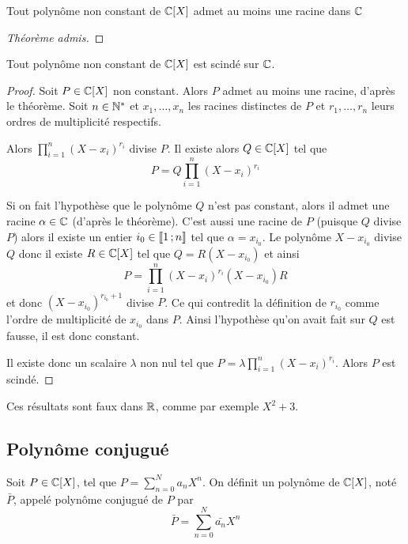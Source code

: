 \begin{theo}
  Tout polynôme non constant de \(\mathbb{C}[X]\) admet au moins une racine dans \(\mathbb{C}\)
\end{theo}
\begin{proof}[Théorème admis]
\end{proof}

\begin{cor}
  Tout polynôme non constant de \(\mathbb{C}[X]\) est scindé sur \(\mathbb{C}\).
\end{cor}
\begin{proof}
  Soit \(P \in \mathbb{C}[X]\) non constant. Alors \(P\) admet au moins une racine, d'après le théorème. Soit \(n \in \mathbb{N}^*\) et \(x_1, \ldots, x_n\) les racines distinctes de \(P\) et \(r_1, \ldots, r_n\) leurs ordres de multiplicité respectifs.

  Alors \(\prod_{i=1}^n (X-x_i)^{r_i}\) divise \(P\). Il existe alors \(Q \in \mathbb{C}[X]\) tel que
  \begin{equation}
    P = Q \prod_{i=1}^n (X-x_i)^{r_i}
  \end{equation}
  
Si on fait l'hypothèse que le polynôme \(Q\) n'est pas constant, alors il admet une racine \(\alpha \in \mathbb{C}\) (d'après le théorème). C'est aussi une racine de \(P\) (puisque \(Q\) divise \(P\)) alors il existe un entier \(i_0 \in \mathopen{\llbracket}1\mathclose{}\mathpunct{};n\mathclose{\rrbracket}\) tel que \(\alpha=x_{i_0}\).
  Le polynôme \(X-x_{i_0}\) divise \(Q\) donc il existe \(R \in \mathbb{C}[X]\) tel que \(Q=R(X-x_{i_0})\) et ainsi
  \begin{equation}
    P = \prod_{i=1}^n (X-x_i)^{r_i} (X-x_{i_0}) R
  \end{equation}
  et donc \((X-x_{i_0})^{r_{i_0}+1}\) divise \(P\). Ce qui contredit la définition de \(r_{i_0}\) comme l'ordre de multiplicité de \(x_{i_0}\) dans \(P\). Ainsi l'hypothèse qu'on avait fait sur \(Q\) est fausse, il est donc constant.

  Il existe donc un scalaire \(\lambda\) non nul tel que \(P=\lambda \prod_{i=1}^n (X-x_i)^{r_i}\). Alors \(P\) est scindé.
\end{proof}

\danger \danger Ces résultats sont faux dans \(\mathbb{R}\), comme par exemple \(X^2+3\).

\subsection{Polynôme conjugué}

\begin{defdef}
  Soit \(P \in \mathbb{C}[X]\), tel que \(P = \sum_{n=0}^N a_n X^n\). On définit un polynôme de \(\mathbb{C}[X]\), noté \(\bar{P}\), appelé polynôme conjugué de \(P\) par
  \begin{equation}
    \bar{P} = \sum_{n=0}^N \bar{a_n} X^n
  \end{equation}
\end{defdef}

